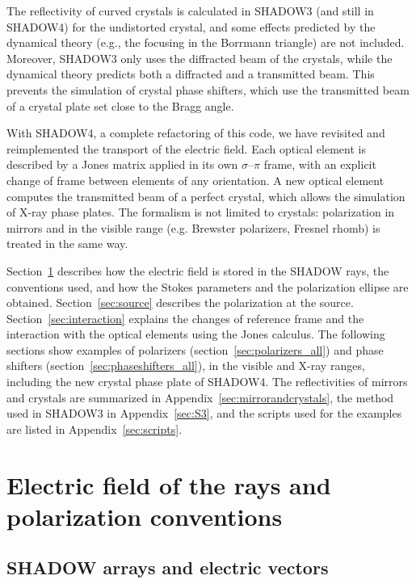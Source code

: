 \documentclass{iucr}
\begin{document}
The reflectivity of curved crystals is calculated in SHADOW3 (and still in SHADOW4) for the undistorted crystal, and some effects predicted by the dynamical theory (e.g., the focusing in the Borrmann triangle) are not included. Moreover, SHADOW3 only uses the diffracted beam of the crystals, while the dynamical theory predicts both a diffracted and a transmitted beam. This prevents the simulation of crystal phase shifters, which use the transmitted beam of a crystal plate set close to the Bragg angle.

With SHADOW4, a complete refactoring of this code, we have revisited and reimplemented the transport of the electric field. Each optical element is described by a Jones matrix applied in its own $\sigma$--$\pi$ frame, with an explicit change of frame between elements of any orientation. A new optical element computes the transmitted beam of a perfect crystal, which allows the simulation of X-ray phase plates. The formalism is not limited to crystals: polarization in mirrors and in the visible range (e.g. Brewster polarizers, Fresnel rhomb) is treated in the same way.

Section~\ref{sec:definitions} describes how the electric field is stored in the SHADOW rays, the conventions used, and how the Stokes parameters and the polarization ellipse are obtained. Section~\ref{sec:source} describes the polarization at the source. Section~\ref{sec:interaction} explains the changes of reference frame and the interaction with the optical elements using the Jones calculus. The following sections show examples of polarizers (section~\ref{sec:polarizers_all}) and phase shifters (section~\ref{sec:phaseshifters_all}), in the visible and X-ray ranges, including the new crystal phase plate of SHADOW4. The reflectivities of mirrors and crystals are summarized in Appendix~\ref{sec:mirrorandcrystals}, the method used in SHADOW3 in Appendix~\ref{sec:S3}, and the scripts used for the examples are listed in Appendix~\ref{sec:scripts}.


\section{Electric field of the rays and polarization conventions}\label{sec:definitions}
\subsection{SHADOW arrays and electric vectors}
\end{document}
